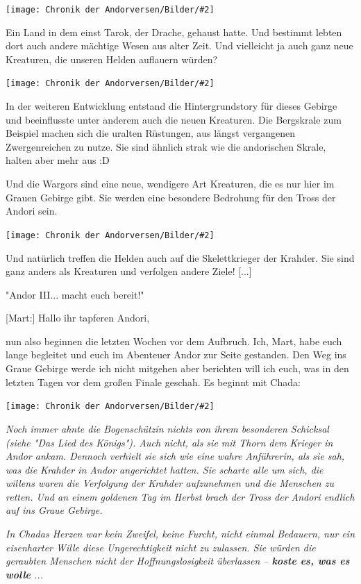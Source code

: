 \documentclass[10pt, a4paper, oneside]{book}
\newcommand{\bildmitts}[2][height=0.32\textwidth,width=0.48\textwidth,keepaspectratio]{%
    \begin{center}
        \texttt{[image: Chronik der Andorversen/Bilder/\#2]}
    \end{center}
}
\begin{document}
\begin{multicols}{2}
\bildmitts{Andor III Preview 1 1.jpeg}

Ein Land in dem einst Tarok, der Drache, gehaust hatte. Und bestimmt lebten dort auch andere mächtige Wesen aus alter Zeit. Und vielleicht ja auch ganz neue Kreaturen, die unseren Helden auflauern würden?

\bildmitts{Andor III Preview 1 2.jpeg}

In der weiteren Entwicklung entstand die Hintergrundstory für dieses Gebirge und beeinflusste unter anderem auch die neuen Kreaturen. Die Bergskrale zum Beispiel machen sich die uralten Rüstungen, aus längst vergangenen Zwergenreichen zu nutze. Sie sind ähnlich strak wie die andorischen Skrale, halten aber mehr aus :D

Und die Wargors sind eine neue, wendigere Art Kreaturen, die es nur hier im Grauen Gebirge gibt. Sie werden eine besondere Bedrohung für den Tross der Andori sein.

\bildmitts{Andor III Preview 1 3.jpeg}

Und natürlich treffen die Helden auch auf die Skelettkrieger der Krahder. Sie sind ganz anders als Kreaturen und verfolgen andere Ziele! [...]

\begin{center}
    "Andor III... macht euch bereit!"
\end{center}

[Mart:] Hallo ihr tapferen Andori,

nun also beginnen die letzten Wochen vor dem Aufbruch. Ich, Mart, habe euch lange begleitet und euch im Abenteuer Andor zur Seite gestanden. Den Weg ins Graue Gebirge werde ich nicht mitgehen aber berichten will ich euch, was in den letzten Tagen vor dem großen Finale geschah. Es beginnt mit Chada:

\bildmitts{Andor III Chada.jpg}

\textit{Noch immer ahnte die Bogenschützin nichts von ihrem besonderen Schicksal (siehe "Das Lied des Königs"). Auch nicht, als sie mit Thorn dem Krieger in Andor ankam. Dennoch verhielt sie sich wie eine wahre Anführerin, als sie sah, was die Krahder in Andor angerichtet hatten. Sie scharte alle um sich, die willens waren die Verfolgung der Krahder aufzunehmen und die Menschen zu retten. Und an einem goldenen Tag im Herbst brach der Tross der Andori endlich auf ins Graue Gebirge.}

\textit{In Chadas Herzen war kein Zweifel, keine Furcht, nicht einmal Bedauern, nur ein eisenharter Wille diese Ungerechtigkeit nicht zu zulassen. Sie würden die geraubten Menschen nicht der Hoffnungslosigkeit überlassen – \textbf{koste es, was es wolle} ...}\bigskip


\end{multicols}
\end{document}

